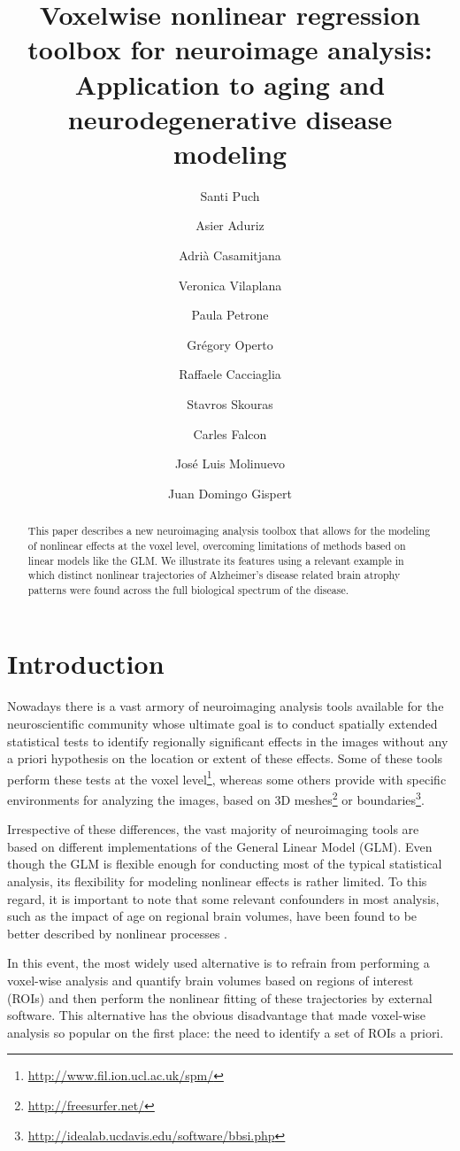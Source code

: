 \documentclass{article}
\title{Voxelwise nonlinear regression toolbox for neuroimage analysis: Application to aging and neurodegenerative disease modeling}
\author[1]{Santi Puch}
\author[1]{Asier Aduriz}
\author[1]{Adrià Casamitjana}
\author[1]{Veronica Vilaplana}
\author[2]{Paula Petrone}
\author[2]{Grégory Operto}
\author[2]{Raffaele Cacciaglia}
\author[2]{Stavros Skouras}
\author[2]{Carles Falcon}
\author[2]{José Luis Molinuevo}
\author[2]{Juan Domingo Gispert}
\affil[1]{Universitat Politècnica de Catalunya, Barcelona, Spain \\
\texttt{veronica.vilaplana@upc.edu}}
\affil[2]{Barcelona$\beta$eta Brain Research Center, Barcelona, Spain}
\begin{document}

\maketitle

\begin{abstract}
This paper describes a new neuroimaging analysis toolbox that allows for the modeling of nonlinear effects at the voxel level, overcoming limitations of methods based on linear models like the GLM. We illustrate its features using a relevant example in which distinct nonlinear trajectories of Alzheimer's disease related brain atrophy patterns were found across the full biological spectrum of the disease.
\end{abstract}

\section{Introduction}

Nowadays there is a vast armory of neuroimaging analysis tools available for the neuroscientific community whose ultimate goal is to conduct spatially extended statistical tests to identify regionally significant effects in the images without any a priori hypothesis on the location or extent of these effects. Some of these tools perform these tests at the voxel level\footnote{\url{http://www.fil.ion.ucl.ac.uk/spm/}}, whereas some others provide with specific environments for analyzing the images, based on 3D meshes\footnote{\url{http://freesurfer.net/}} or boundaries\footnote{\url{http://idealab.ucdavis.edu/software/bbsi.php}}. 

Irrespective of these differences, the vast majority of neuroimaging tools are based on different implementations of the General Linear Model (GLM). Even though the GLM is flexible enough for conducting most of the typical statistical analysis, its flexibility for modeling nonlinear effects is rather limited. To this regard, it is important to note that some relevant confounders in most analysis, such as the impact of age on regional brain volumes, have been found to be better described by nonlinear processes \cite{nonlinear_subcortical,nonlinear_cortical}.

In this event, the most widely used alternative is to refrain from performing a voxel-wise analysis and quantify brain volumes based on regions of interest (ROIs) and then perform the nonlinear fitting of these trajectories by external software. This alternative has the obvious disadvantage that made voxel-wise analysis so popular on the first place: the need to identify a set of ROIs a priori. 
\end{document}
